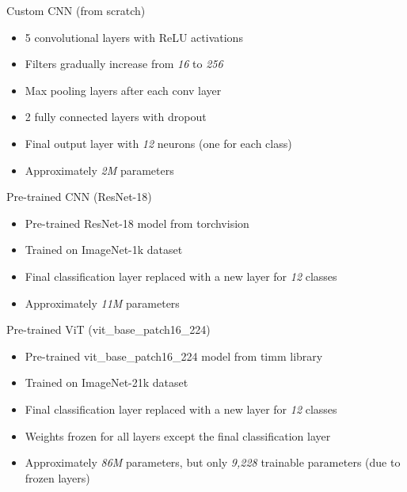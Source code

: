 \documentclass{beamer}
\begin{document}
\begin{frame}{Custom CNN (from scratch)}
    \begin{itemize}
        \item 5 convolutional layers with ReLU activations
        \item Filters gradually increase from \textit{16} to \textit{256}
        \item Max pooling layers after each conv layer
        \item 2 fully connected layers with dropout
        \item Final output layer with \textit{12} neurons (one for each class)
        \item Approximately \textit{2M} parameters
    \end{itemize}
\end{frame}

\begin{frame}{Pre-trained CNN (ResNet-18)}
    \begin{itemize}
        \item Pre-trained ResNet-18 model from torchvision
        \item Trained on ImageNet-1k dataset
        \item Final classification layer replaced with a new layer for \textit{12} classes
        \item Approximately \textit{11M} parameters
    \end{itemize}
\end{frame}

\begin{frame}{Pre-trained ViT (vit\_base\_patch16\_224)}
    \begin{itemize}
        \item Pre-trained vit\_base\_patch16\_224 model from timm library
        \item Trained on ImageNet-21k dataset
        \item Final classification layer replaced with a new layer for \textit{12} classes
        \item Weights frozen for all layers except the final classification layer
        \item Approximately \textit{86M} parameters, but only \textit{9,228} trainable parameters (due to frozen layers)
    \end{itemize}
\end{frame}
\end{document}
